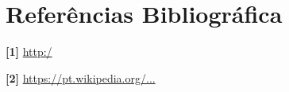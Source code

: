 \documentclass[12pt,a4paper]{article}
\begin{document}




%

%


\section{Referências Bibliográfica}
\noindent \textbf{[1]} \url {http:/}\\\vspace{0.2cm}

\noindent \textbf{[2] }\url{https://pt.wikipedia.org/...}\\\vspace{0.2cm}
\end{document}

